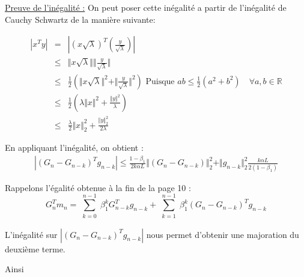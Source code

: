 \documentclass{article}
\begin{document}
\bigskip

\noindent \underline{Preuve de l'inégalité :} On peut poser cette inégalité a partir de l'inégalité de Cauchy Schwartz de la manière suivante:

\bigskip

\begin{eqnarray*}
    |x^T y | &=& | (x \sqrt{\lambda})^T( \frac{y}{\sqrt{\lambda}})| \\
    &\leq& \Vert x \sqrt{\lambda} \Vert \Vert \frac{y}{\sqrt{\lambda} } \Vert \\
    &\leq& \frac{1}{2} \left ( \Vert x \sqrt{\lambda}  \Vert^2  + \Vert \frac{y}{\sqrt{\lambda} } \Vert^2 \right ) \textrm{ Puisque $ab \leq \frac{1}{2} (a^2+b^2) \quad  \forall a,b \in \mathbb{R}$} \\
    &\leq& \frac{1}{2} \left ( \lambda \Vert x  \Vert^2  +  \frac{\Vert y \Vert^2}{\lambda }  \right ) \\
    &\leq& \frac{\lambda}{2}  \Vert x \Vert ^2_2 + \frac{ \Vert y \Vert _2^2}{2 \lambda}
\end{eqnarray*}




\bigskip

En appliquant l'inégalité, on obtient :
\begin{eqnarray*}
     |(G_n-G_{n-k})^T g_{n-k} | \leq \frac{1-\beta_1}{2 k \alpha L}  \Vert (G_n-G_{n-k}) \Vert _2^2+  \Vert g_{n-k}  \Vert _2^2 \frac{k \alpha L}{2 (1-\beta_1)}
\end{eqnarray*}

\bigskip

Rappelons l'égalité obtenue à la fin de la page 10 :
\begin{equation*}
    G^T_n m_n= \sum\limits_{\substack {k=0}}^{n-1} \beta_1^k G_{n-k}^T g_{n-k}+ \sum\limits_{\substack {k=1}}^{n-1} \beta_1^k (G_n- G_{n-k})^T g_{n-k}
\end{equation*}


\bigskip

L'inégalité sur $ | (G_n-G_{n-k})^T g_{n-k} |$ nous permet d'obtenir une majoration du deuxième terme.

\bigskip



\bigskip

Ainsi
\end{document}
